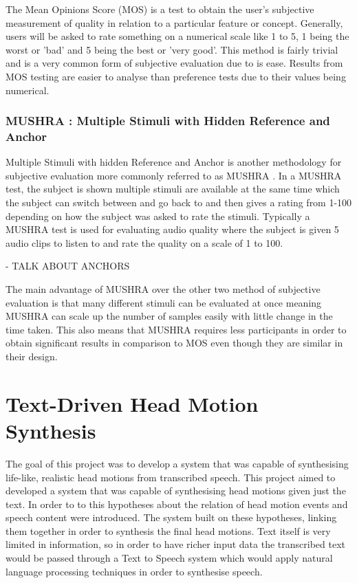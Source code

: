 \documentclass[bsc,frontabs,twoside,singlespacing,parskip]{infthesis}
\begin{document}
The Mean Opinions Score (MOS) is a test to obtain the user's subjective measurement of quality in relation to a particular feature or concept. Generally, users will be asked to rate something on a numerical scale like 1 to 5, 1 being the worst or 'bad' and 5 being the best or 'very good'. This method is fairly trivial and is a very common form of subjective evaluation due to is ease. Results from MOS testing are easier to analyse than preference tests due to their values being numerical.

\subsection{MUSHRA : Multiple Stimuli with Hidden Reference and Anchor}

Multiple Stimuli with hidden Reference and Anchor is another methodology for subjective evaluation more commonly referred to as MUSHRA \cite{mushra}. In a MUSHRA test, the subject is shown multiple stimuli are available at the same time which the subject can switch between and go back to and then gives a rating from 1-100 depending on how the subject was asked to rate the stimuli. Typically a MUSHRA test is used for evaluating audio quality \cite{mushra_bbc} where the subject is given 5 audio clips to listen to and rate the quality on a scale of 1 to 100.

- TALK ABOUT ANCHORS

The main advantage of MUSHRA over the other two method of subjective evaluation is that many different stimuli can be evaluated at once meaning MUSHRA can scale up the number of samples easily with little change in the time taken. This also means that MUSHRA requires less participants in order to obtain significant results in comparison to MOS even though they are similar in their design.


\chapter{Text-Driven Head Motion Synthesis}

The goal of this project was to develop a system that was capable of synthesising life-like, realistic head motions from transcribed speech. This project aimed to developed a system that was capable of synthesising head motions given just the text. In order to to this hypotheses about the relation of head motion events and speech content were introduced. The system built on these hypotheses, linking them together in order to synthesis the final head motions. Text itself is very limited in information, so in order to have richer input data the transcribed text would be passed through a Text to Speech system which would apply natural language processing techniques in order to synthesise speech. 
\end{document}
